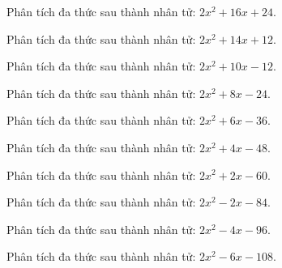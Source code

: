 \begin{bt}
	Phân tích đa thức sau thành nhân tử: $2 x^2 + 16 x + 24$.
\end{bt}
\begin{bt}
	Phân tích đa thức sau thành nhân tử: $2 x^2 + 14 x + 12$.
\end{bt}
\begin{bt}
	Phân tích đa thức sau thành nhân tử: $2 x^2 + 10 x - 12$.
\end{bt}
\begin{bt}
	Phân tích đa thức sau thành nhân tử: $2 x^2 + 8 x - 24$.
\end{bt}
\begin{bt}
	Phân tích đa thức sau thành nhân tử: $2 x^2 + 6 x - 36$.
\end{bt}
\begin{bt}
	Phân tích đa thức sau thành nhân tử: $2 x^2 + 4 x - 48$.
\end{bt}
\begin{bt}
	Phân tích đa thức sau thành nhân tử: $2 x^2 + 2 x - 60$.
\end{bt}
\begin{bt}
	Phân tích đa thức sau thành nhân tử: $2 x^2 - 2 x - 84$.
\end{bt}
\begin{bt}
	Phân tích đa thức sau thành nhân tử: $2 x^2 - 4 x - 96$.
\end{bt}
\begin{bt}
	Phân tích đa thức sau thành nhân tử: $2 x^2 - 6 x - 108$.
\end{bt}
